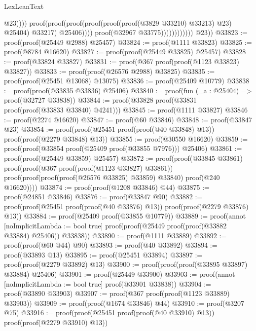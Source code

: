 \begin{lexlean}{LexLeanText}
\begin{coremodule}
                                                            @23))))
                                                  proof(proof(proof(proof(proof(proof(@3829 @33210)
                                                              @33213)
                                                            @23)
                                                          @25404)
                                                        @33217)
                                                      @25406))))
                                        proof(@32967 @33775))))))))))))
        @23))
@33823 := proof(proof(@25449 @2988) @25457)
@33824 := proof(@1111 @33823)
@33825 := proof(@8784 @16620)
@33827 := proof(proof(@25449 @33825) @25457)
@33828 := proof(@33824 @33827)
@33831 := proof(@367 proof(proof(@1123 @33823) @33827))
@33833 := proof(proof(@26576 @2988) @33825)
@33835 := proof(proof(@25451 @13068) @13075)
@33836 := proof(@25409 @10779)
@33838 := proof(proof(@33835 @33836) @25406)
@33840 := proof(fun (_a : @25404) => proof(@32727 @33838))
@33844 := proof(@33828 proof(@33831 proof(proof(@33833 @33840) @4241)))
@33845 := proof(@1111 @33827)
@33846 := proof(@2274 @16620)
@33847 := proof(@60 @33846)
@33848 := proof(@33847 @23)
@33854 := proof(proof(@25451 proof(proof(@40 @33848) @13)) proof(proof(@2279 @33848) @13))
@33855 := proof(@30550 @16620)
@33859 := proof(proof(@33854 proof(@25409 proof(@33855 @7976))) @25406)
@33861 := proof(proof(@25449 @33859) @25457)
@33872 := proof(proof(@33845 @33861)
      proof(proof(@367 proof(proof(@1123 @33827) @33861))
          proof(proof(proof(proof(@26576 @33825) @33859) @33840) proof(@240 @16620))))
@33874 := proof(proof(@1208 @33846) @44)
@33875 := proof(@24851 @33846)
@33876 := proof(@33847 @90)
@33882 := proof(proof(@25451 proof(proof(@40 @33876) @13)) proof(proof(@2279 @33876) @13))
@33884 := proof(@25409 proof(@33855 @10779))
@33889 := proof(annot [noImplicitLambda := bool true]
    proof(proof(@25449 proof(proof(@33882 @33884) @25406)) @33838))
@33890 := proof(@1111 @33889)
@33892 := proof(proof(@60 @44) @90)
@33893 := proof(@40 @33892)
@33894 := proof(@33893 @13)
@33895 := proof(@25451 @33894)
@33897 := proof(proof(@2279 @33892) @13)
@33900 := proof(proof(proof(@33895 @33897) @33884) @25406)
@33901 := proof(@25449 @33900)
@33903 := proof(annot [noImplicitLambda := bool true] proof(@33901 @33838))
@33904 := proof(@33890 @33903)
@33907 := proof(@367 proof(proof(@1123 @33889) @33903))
@33909 := proof(proof(@1674 @33846) @44)
@33910 := proof(@3207 @75)
@33916 := proof(proof(@25451 proof(proof(@40 @33910) @13)) proof(proof(@2279 @33910) @13))

\end{coremodule}
\end{lexlean}
